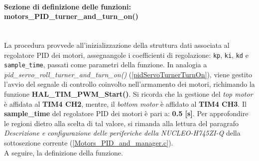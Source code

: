 \paragraph{Sezione di definizione delle funzioni: motors\_PID\_turner\_and\_turn\_on()}\mbox{}\\
La procedura provvede all'inizializzazione della struttura dati associata al regolatore PID dei motori, assegnangole i coefficienti di regolazione: \texttt{kp}, \texttt{ki}, \texttt{kd} e \texttt{sample\_time}, passati come parametri della funzione.
In analogia a \textit{pid\_servo\_roll\_turner\_and\_turn\_on()} (\ref{pidServoTurnerTurnOn}), viene gestito l'avvio del segnale di controllo coinvolto nell'armamento dei motori, richimando la funzione \textbf{HAL\_TIM\_PWM\_Start()}.
Si ricorda che la gestione del \textit{top motor} è affidata al \textbf{TIM4 CH2}, mentre, il \textit{bottom motor} è affidato al \textbf{TIM4 CH3}.
Il \textbf{sample\_time} del regolatore PID dei motori è pari a: \textbf{0.5 [s]}. Per approfondire le regioni dietro alla scelta di tal valore, si rimanda alla lettura del paragrafo \textit{Descrizione e configurazione delle periferiche della NUCLEO-H745ZI-Q} della sottosezione corrente (\ref{Motors_PID_and_manager.c}).\\
A seguire, la definizione della funzione.



